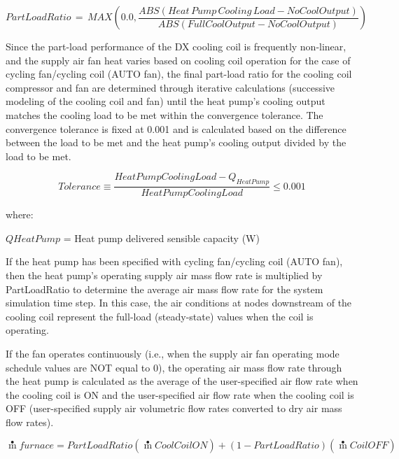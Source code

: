 \begin{equation}
PartLoadRatio\, = \,MAX\left( {0.0,\frac{{ABS\left( {Heat\,Pump\,Cooling\,Load - NoCoolOutput} \right)}}{{ABS\left( {FullCoolOutput - NoCoolOutput} \right)}}} \right)
\end{equation}

Since the part-load performance of the DX cooling coil is frequently non-linear, and the supply air fan heat varies based on cooling coil operation for the case of cycling fan/cycling coil (AUTO fan), the final part-load ratio for the cooling coil compressor and fan are determined through iterative calculations (successive modeling of the cooling coil and fan) until the heat pump's cooling output matches the cooling load to be met within the convergence tolerance. The convergence tolerance is fixed at 0.001 and is calculated based on the difference between the load to be met and the heat pump's cooling output divided by the load to be met.

\begin{equation}
  Tolerance \equiv \frac{HeatPumpCoolingLoad - Q_{HeatPump}}{HeatPumpCoolingLoad} \leq 0.001
\end{equation}

where:

\(QHeatPump\) = Heat pump delivered sensible capacity (W)

If the heat pump has been specified with cycling fan/cycling coil (AUTO fan), then the heat pump's operating supply air mass flow rate is multiplied by PartLoadRatio to determine the average air mass flow rate for the system simulation time step. In this case, the air conditions at nodes downstream of the cooling coil represent the full-load (steady-state) values when the coil is operating.

If the fan operates continuously (i.e., when the supply air fan operating mode schedule values are NOT equal to 0), the operating air mass flow rate through the heat pump is calculated as the average of the user-specified air flow rate when the cooling coil is ON and the user-specified air flow rate when the cooling coil is OFF (user-specified supply air volumetric flow rates converted to dry air mass flow rates).

\begin{equation}
\mathop m\limits^ \bullet  furnace = PartLoadRatio\left( {\mathop m\limits^ \bullet  CoolCoilON} \right) + \left( {1 - PartLoadRatio} \right)\left( {\mathop m\limits^ \bullet  CoilOFF} \right)
\end{equation}

